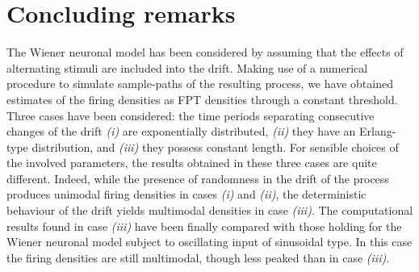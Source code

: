 \section{Concluding remarks}\label{section:8}
The Wiener neuronal model has been considered by assuming that the effects of 
alternating stimuli are included into the drift. Making use of a numerical 
procedure to simulate sample-paths of the resulting process, we have obtained 
estimates of the firing densities as FPT densities through a constant threshold. 
Three cases have been considered: the time periods separating consecutive
changes of the drift {\em (i)\/} are exponentially distributed, {\em (ii)\/} 
they have an Erlang-type distribution, and {\em (iii)\/} they possess constant 
length. For sensible choices of the involved parameters, the results obtained 
in these three cases are quite different. Indeed, while the presence 
of randomness in the drift of the process produces unimodal firing densities 
in cases {\em (i)\/} and {\em (ii)\/}, the deterministic behaviour of the drift 
yields multimodal densities in case {\em (iii)\/}. The computational results found 
in case {\em (iii)\/} have been finally compared with those holding for the Wiener
neuronal model subject to oscillating input of sinusoidal type. In this case the
firing densities are still multimodal, though less peaked than in case {\em (iii)\/}.
